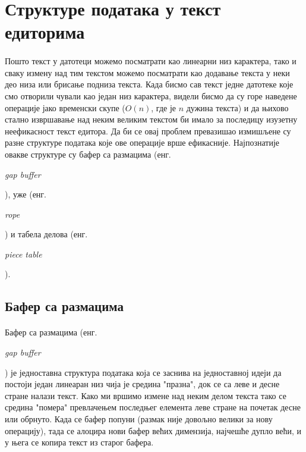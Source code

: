 \documentclass[12pt,oneside]{memoir}
\begin{document}
\section{Структуре података у текст едиторима}
\paragraph{}
Пошто текст у датотеци можемо посматрати као линеарни низ карактера, 
тако и сваку измену над тим текстом можемо посматрати као додавање текста у
неки део низа или брисање подниза текста. Када бисмо сав текст једне датотеке
које смо отворили чували као један низ карактера, видели бисмо да су горе наведене 
операције јако временски скупе (\(O(n)\), где је \(n\) дужина текста) и да њихово стално 
извршавање над неким великим текстом би имало за последицу изузетну неефикасност текст едитора.
Да би се овај проблем превазишао измишљене су разне структуре података које ове операције
врше ефикасније. Најпознатије овакве структуре су бафер са размацима 
(енг. \begin{latinica}\textit{gap buffer}\end{latinica}), уже (енг. 
\begin{latinica}\textit{rope}\end{latinica}) и табела делова (енг. 
\begin{latinica}\textit{piece table}\end{latinica}).

\subsection{Бафер са размацима}
\paragraph{}
Бафер са размацима (енг. \begin{latinica}\textit{gap buffer}\end{latinica}) је једноставна структура
података која се заснива на једноставној идеји да постоји један линеаран низ чија је средина
"празна", док се са леве и десне стране налази текст. Како ми вршимо измене над неким делом 
текста тако се средина "помера" превлачењем последњег елемента леве стране на почетак десне
или обрнуто. Када се бафер попуни (размак није довољно велики за нову операцију), тада се 
алоцира нови бафер већих димензија, најчешће дупло већи, и у њега се копира текст из старог
бафера.
\end{document}
